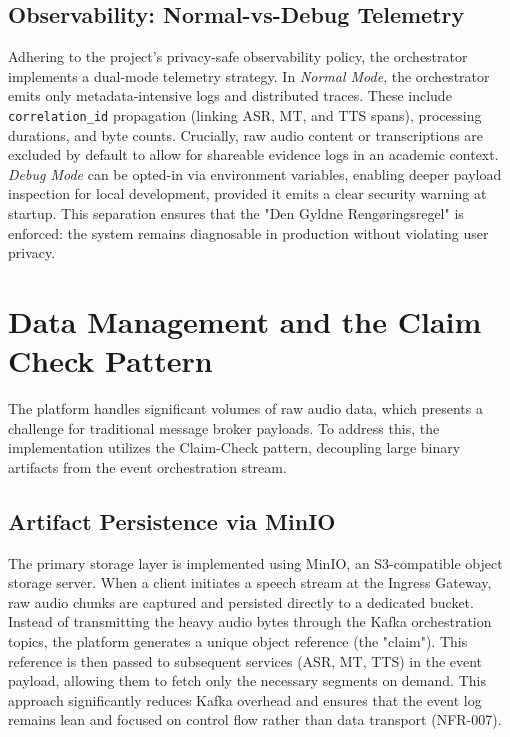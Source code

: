 \subsection{Observability: Normal-vs-Debug Telemetry}
Adhering to the project's privacy-safe observability policy, the orchestrator implements a dual-mode telemetry strategy. In \textit{Normal Mode}, the orchestrator emits only metadata-intensive logs and distributed traces. These include \texttt{correlation\_id} propagation (linking ASR, MT, and TTS spans), processing durations, and byte counts. Crucially, raw audio content or transcriptions are excluded by default to allow for shareable evidence logs in an academic context. \textit{Debug Mode} can be opted-in via environment variables, enabling deeper payload inspection for local development, provided it emits a clear security warning at startup. This separation ensures that the "Den Gyldne Rengøringsregel" is enforced: the system remains diagnosable in production without violating user privacy.

\section{Data Management and the Claim Check Pattern}
\label{sec:impl_data_management}

The platform handles significant volumes of raw audio data, which presents a challenge for traditional message broker payloads. To address this, the implementation utilizes the Claim-Check pattern, decoupling large binary artifacts from the event orchestration stream.

\subsection{Artifact Persistence via MinIO}
The primary storage layer is implemented using MinIO, an S3-compatible object storage server. When a client initiates a speech stream at the Ingress Gateway, raw audio chunks are captured and persisted directly to a dedicated bucket. Instead of transmitting the heavy audio bytes through the Kafka orchestration topics, the platform generates a unique object reference (the "claim"). This reference is then passed to subsequent services (ASR, MT, TTS) in the event payload, allowing them to fetch only the necessary segments on demand. This approach significantly reduces Kafka overhead and ensures that the event log remains lean and focused on control flow rather than data transport (NFR-007).

